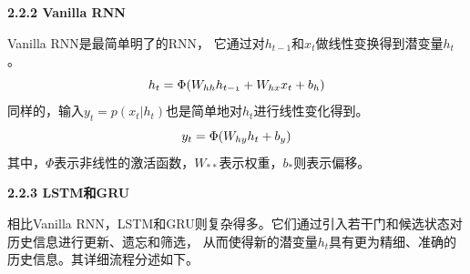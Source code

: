      \textbf{2.2.2 Vanilla RNN}

      Vanilla RNN是最简单明了的RNN，
      它通过对$h_{t-1}$和$x_{t}$做线性变换得到潜变量$h_t$。
      \begin{equation} \label{va_rnn_hidden}
        \mathnormal{h_t} = \Phi(\mathnormal{W_{hh}}\mathnormal{h_{t-1}} + 
        \mathnormal{W_{hx}}\mathnormal{x_{t}} + \mathnormal{b_h})
      \end{equation}
      同样的，输入$y_t = p(x_t | h_t)$也是简单地对$h_t$进行线性变化得到。
      \begin{equation}
        \mathnormal{y_t} = \Phi(W_{hy}h_t + b_y)
      \end{equation}
    其中，$\Phi$表示非线性的激活函数，$W_{**}$表示权重，$b_*$则表示偏移。

      \textbf{2.2.3 LSTM和GRU}

      相比Vanilla RNN，LSTM和GRU则复杂得多。它们通过引入若干门和候选状态对历史信息进行更新、遗忘和筛选，
      从而使得新的潜变量$h_t$具有更为精细、准确的历史信息。其详细流程分述如下。

